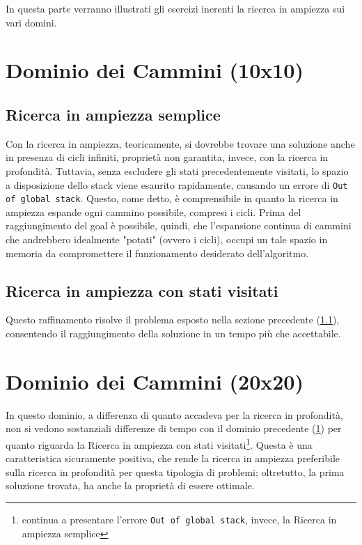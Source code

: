 In questa parte verranno illustrati gli esercizi inerenti la ricerca in ampiezza sui vari domini.

\section{Dominio dei Cammini (10x10)}\label{sec:10-amp}
\subsection{Ricerca in ampiezza semplice}\label{sec:10-amp-semplice}
Con la ricerca in ampiezza, teoricamente, si dovrebbe trovare una soluzione anche in presenza di cicli infiniti, proprietà non garantita, invece, con la ricerca in profondità. Tuttavia, senza escludere gli stati precedentemente visitati, lo spazio a disposizione dello stack viene esaurito rapidamente, causando un errore di \texttt{Out of global stack}. Questo, come detto, è comprensibile in quanto la ricerca in ampiezza espande ogni cammino possibile, compresi i cicli. Prima del raggiungimento del goal è possibile, quindi, che l'espansione continua di cammini che andrebbero idealmente "potati" (ovvero i cicli), occupi un tale spazio in memoria da compromettere il funzionamento desiderato dell'algoritmo.

\subsection{Ricerca in ampiezza con stati visitati}
Questo raffinamento risolve il problema esposto nella sezione precedente (\ref{sec:10-amp-semplice}), consentendo il raggiungimento della soluzione in un tempo più che accettabile.

\section{Dominio dei Cammini (20x20)} \label{sec:20-amp}
In questo dominio, a differenza di quanto accadeva per la ricerca in profondità, non si vedono sostanziali differenze di tempo con il dominio precedente (\ref{sec:10-amp}) per quanto riguarda la Ricerca in ampiezza con stati visitati\footnote{continua a presentare l'errore \texttt{Out of global stack}, invece, la Ricerca in ampiezza semplice}. Questa è una caratteristica sicuramente positiva, che rende la ricerca in ampiezza preferibile sulla ricerca in profondità per questa tipologia di problemi; oltretutto, la prima soluzione trovata, ha anche la proprietà di essere ottimale.

